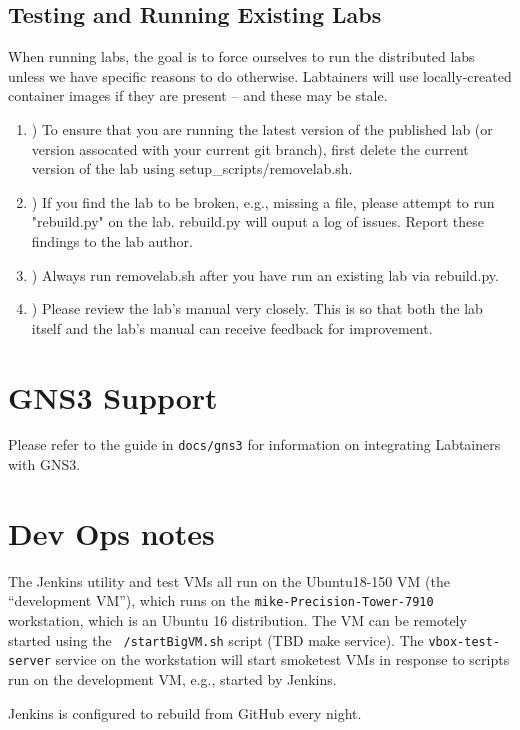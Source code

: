 \documentclass[12pt]{article}
\begin{document}
\subsection{Testing and Running Existing Labs}
When running labs, the goal is to force ourselves to run the distributed labs unless we have specific reasons to do otherwise.
Labtainers will use locally-created container images if they are present -- and these may be stale.
\begin{enumerate}[label=\Alph*]
	\item )   To ensure that you are running the latest version of the published lab (or version assocated with your current git branch), first delete the current version of the lab using setup\_scripts/removelab.sh.  

	\item )   If you find the lab to be broken, e.g., missing a file, please attempt to run "rebuild.py" on the lab. rebuild.py will ouput a log of issues. Report these findings to the lab author.  

	\item )   Always run removelab.sh after you have run an existing lab via rebuild.py.  

	\item )   Please review the lab's manual very closely. This is so that both the lab itself and the lab's manual can receive feedback for improvement. 
\end{enumerate}

\section{GNS3 Support}
Please refer to the guide in {\tt docs/gns3} for information on integrating Labtainers with GNS3.

\section{Dev Ops notes}
The Jenkins utility and test VMs all run on the Ubuntu18-150 VM (the ``development VM''), which runs on the 
{\tt mike-Precision-Tower-7910} workstation, which is an Ubuntu 16 distribution.  
The VM can be remotely started using the {\tt ~/startBigVM.sh} script (TBD make service).
The {\tt vbox-test-server} service on the workstation will start smoketest VMs in response
to scripts run on the development VM, e.g., started by Jenkins.

Jenkins is configured to rebuild from GitHub every night.
\end{document}
